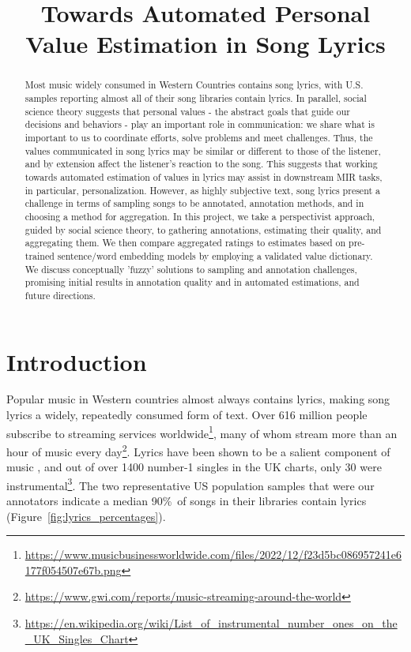 \documentclass{article}
\title{Towards Automated Personal Value Estimation in Song Lyrics}
\begin{document}
%
\maketitle
%
\begin{abstract}
Most music widely consumed in Western Countries contains song lyrics, with U.S. samples reporting almost all of their song libraries contain lyrics. In parallel, social science theory suggests that personal values - the abstract goals that guide our decisions and behaviors - play an important role in communication: we share what is important to us to coordinate efforts, solve problems and meet challenges. Thus, the values communicated in song lyrics may be similar or different to those of the listener, and by extension affect the listener's reaction to the song. This suggests that working towards automated estimation of values in lyrics may assist in downstream MIR tasks, in particular, personalization. However, as highly subjective text, song lyrics present a challenge in terms of sampling songs to be annotated, annotation methods, and in choosing a method for aggregation. In this project, we take a perspectivist approach, guided by social science theory, to gathering annotations, estimating their quality, and aggregating them. We then compare aggregated ratings to estimates based on pre-trained sentence/word embedding models by employing a validated value dictionary. We discuss conceptually 'fuzzy' solutions to sampling and annotation challenges, promising initial results in annotation quality and in automated estimations, and future directions. 
\end{abstract}

\section{Introduction}\label{sec:introduction}
Popular music in Western countries almost always contains lyrics, making song lyrics a widely, repeatedly consumed \cite{conrad2019extreme} form of text. Over 616 million people subscribe to streaming services worldwide\footnote{\url{https://www.musicbusinessworldwide.com/files/2022/12/f23d5bc086957241e6177f054507e67b.png}}, many of whom stream more than an hour of music every day\footnote{\url{https://www.gwi.com/reports/music-streaming-around-the-world}}. Lyrics have been shown to be a salient component of music \cite{demetriou2018vocals}, and out of over 1400 number-1 singles in the UK charts, only 30 were instrumental\footnote{\url{https://en.wikipedia.org/wiki/List_of_instrumental_number_ones_on_the_UK_Singles_Chart}}. The two representative US population samples that were our annotators indicate a median 90\%\ of songs in their libraries contain lyrics (Figure~\ref{fig:lyrics_percentages}). 
\end{document}
